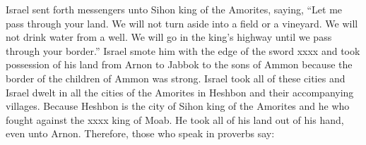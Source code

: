 \begin{inparaenum}
    
    \pvab{}{}%
    
    
    
    \pvdb{}{}%
    
    
    \pvdb{}{}%
    
    
     Israel sent forth messengers unto Sihon king of the Amorites, saying,%
     ``Let me pass through your land. We will not turn aside into a field or a vineyard. We will not drink water from a well. We will go in the king's highway until we pass through your border.''%
     Israel smote him with the edge of the sword xxxx and took possession of his land from Arnon to Jabbok to the sons of Ammon because the border of the children of Ammon was strong.%
     Israel took all of these cities and Israel dwelt in all the cities of the Amorites in Heshbon and their accompanying villages.%
     Because Heshbon is the city of Sihon king of the Amorites and he who fought against the xxxx king of Moab. He took all of his land out of his hand, even unto Arnon.%
     Therefore, those who speak in proverbs say:%
    
    
    
    
    
    
    
    

\end{inparaenum}
